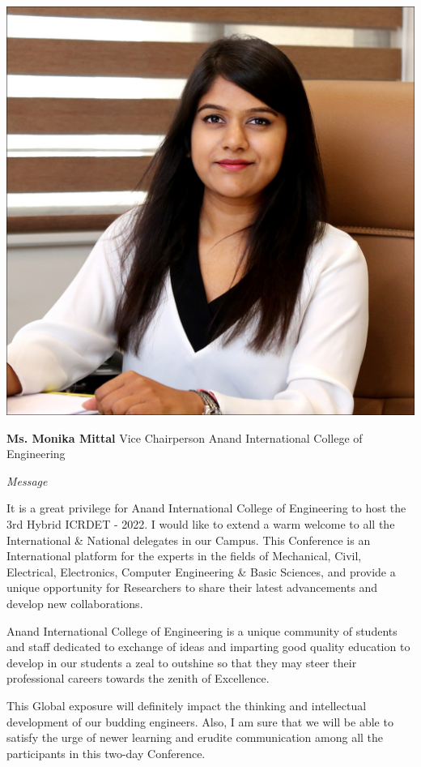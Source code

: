 \documentclass[twoside,11pt]{amsart}
\begin{document}
\vskip 5mm
\newpage
\vskip 1mm
\begin{flushright}
\includegraphics[height=8\baselineskip]{VC}
\end{flushright}
\vskip 1mm
\hfill \textbf{Ms. Monika Mittal}
\vskip 1mm
\hfill Vice Chairperson
\vskip 1mm
\hfill Anand International College of Engineering
\vskip 10mm
\centerline {\huge{\emph{Message}}}
\vskip 5mm
It is a great privilege for Anand International College of Engineering to host the
3rd Hybrid ICRDET - 2022. I would like to extend a warm welcome to all the
International \& National delegates in our Campus. This Conference is an
International platform for the experts in the fields of Mechanical, Civil, Electrical,
Electronics, Computer Engineering \& Basic Sciences, and provide a unique
opportunity for Researchers to share their latest advancements and develop new
collaborations.

Anand International College of Engineering is a unique community of students
and staff dedicated to exchange of ideas and imparting good quality education to
develop in our students a zeal to outshine so that they may steer their
professional careers towards the zenith of Excellence.

This Global exposure will definitely impact the thinking and intellectual
development of our budding engineers. Also, I am sure that we will be able to
satisfy the urge of newer learning and erudite communication among all the
participants in this two-day Conference.
\end{document}
